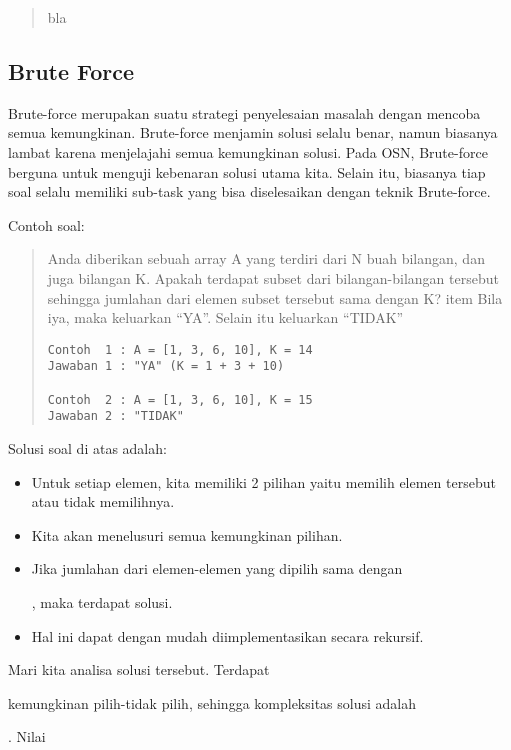 \documentclass[]{article}
\providecommand{\tightlist}{%
  \setlength{\itemsep}{0pt}\setlength{\parskip}{0pt}}
\begin{document}
\begin{quote}
bla
\end{quote}

\subsection{Brute Force}\label{brute-force}

Brute-force merupakan suatu strategi penyelesaian masalah dengan mencoba
semua kemungkinan. Brute-force menjamin solusi selalu benar, namun
biasanya lambat karena menjelajahi semua kemungkinan solusi. Pada OSN,
Brute-force berguna untuk menguji kebenaran solusi utama kita. Selain
itu, biasanya tiap soal selalu memiliki sub-task yang bisa diselesaikan
dengan teknik Brute-force.

Contoh soal:

\begin{quote}
Anda diberikan sebuah array A yang terdiri dari N buah bilangan, dan
juga bilangan K. Apakah terdapat subset dari bilangan-bilangan tersebut
sehingga jumlahan dari elemen subset tersebut sama dengan K? item Bila
iya, maka keluarkan ``YA''. Selain itu keluarkan ``TIDAK''

\begin{verbatim}
Contoh  1 : A = [1, 3, 6, 10], K = 14
Jawaban 1 : "YA" (K = 1 + 3 + 10)

Contoh  2 : A = [1, 3, 6, 10], K = 15
Jawaban 2 : "TIDAK"
\end{verbatim}
\end{quote}

Solusi soal di atas adalah:

\begin{itemize}
\tightlist
\item
  Untuk setiap elemen, kita memiliki 2 pilihan yaitu memilih elemen
  tersebut atau tidak memilihnya.
\item
  Kita akan menelusuri semua kemungkinan pilihan.
\item
  Jika jumlahan dari elemen-elemen yang dipilih sama dengan

  , maka terdapat solusi.
\item
  Hal ini dapat dengan mudah diimplementasikan secara rekursif.
\end{itemize}

Mari kita analisa solusi tersebut. Terdapat

kemungkinan pilih-tidak pilih, sehingga kompleksitas solusi adalah

. Nilai
\end{document}
